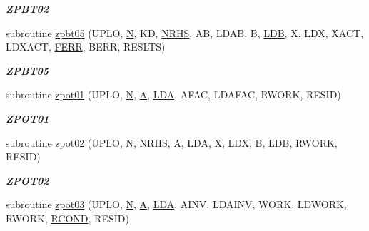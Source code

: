 \begin{DoxyCompactItemize}
\begin{DoxyCompactList}\small\item\em {\bfseries Z\+P\+B\+T02} \end{DoxyCompactList}\item 
subroutine \hyperlink{group__complex16__lin_ga318dc4b25035c0d0a9af021761890b4f}{zpbt05} (U\+P\+L\+O, \hyperlink{polmisc_8c_a0240ac851181b84ac374872dc5434ee4}{N}, K\+D, \hyperlink{example__user_8c_aa0138da002ce2a90360df2f521eb3198}{N\+R\+H\+S}, A\+B, L\+D\+A\+B, B, \hyperlink{example__user_8c_a50e90a7104df172b5a89a06c47fcca04}{L\+D\+B}, X, L\+D\+X, X\+A\+C\+T, L\+D\+X\+A\+C\+T, \hyperlink{superlu__enum__consts_8h_af00a42ecad444bbda75cde1b64bd7e72a78fd14d7abebae04095cfbe02928f153}{F\+E\+R\+R}, B\+E\+R\+R, R\+E\+S\+L\+T\+S)
\begin{DoxyCompactList}\small\item\em {\bfseries Z\+P\+B\+T05} \end{DoxyCompactList}\item 
subroutine \hyperlink{group__complex16__lin_ga873ab95ac0c32105c0c0be2adb72d205}{zpot01} (U\+P\+L\+O, \hyperlink{polmisc_8c_a0240ac851181b84ac374872dc5434ee4}{N}, \hyperlink{classA}{A}, \hyperlink{example__user_8c_ae946da542ce0db94dced19b2ecefd1aa}{L\+D\+A}, A\+F\+A\+C, L\+D\+A\+F\+A\+C, R\+W\+O\+R\+K, R\+E\+S\+I\+D)
\begin{DoxyCompactList}\small\item\em {\bfseries Z\+P\+O\+T01} \end{DoxyCompactList}\item 
subroutine \hyperlink{group__complex16__lin_gab8170aa009a781e78c815b8d9bafab16}{zpot02} (U\+P\+L\+O, \hyperlink{polmisc_8c_a0240ac851181b84ac374872dc5434ee4}{N}, \hyperlink{example__user_8c_aa0138da002ce2a90360df2f521eb3198}{N\+R\+H\+S}, \hyperlink{classA}{A}, \hyperlink{example__user_8c_ae946da542ce0db94dced19b2ecefd1aa}{L\+D\+A}, X, L\+D\+X, B, \hyperlink{example__user_8c_a50e90a7104df172b5a89a06c47fcca04}{L\+D\+B}, R\+W\+O\+R\+K, R\+E\+S\+I\+D)
\begin{DoxyCompactList}\small\item\em {\bfseries Z\+P\+O\+T02} \end{DoxyCompactList}\item 
subroutine \hyperlink{group__complex16__lin_ga0b7ccd92df6065f4ab5fbdd16c9d373d}{zpot03} (U\+P\+L\+O, \hyperlink{polmisc_8c_a0240ac851181b84ac374872dc5434ee4}{N}, \hyperlink{classA}{A}, \hyperlink{example__user_8c_ae946da542ce0db94dced19b2ecefd1aa}{L\+D\+A}, A\+I\+N\+V, L\+D\+A\+I\+N\+V, W\+O\+R\+K, L\+D\+W\+O\+R\+K, R\+W\+O\+R\+K, \hyperlink{superlu__enum__consts_8h_af00a42ecad444bbda75cde1b64bd7e72a9b5c151728d8512307565994c89919d5}{R\+C\+O\+N\+D}, R\+E\+S\+I\+D)

\end{DoxyCompactItemize}
